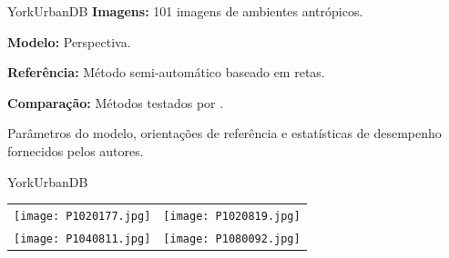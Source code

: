\begin{frame}{YorkUrbanDB}{}
  {\bf Imagens:} 101 imagens de ambientes antrópicos.

  {\bf Modelo:} Perspectiva.

  {\bf Referência:} Método semi-automático baseado em retas.

  {\bf Comparação:} Métodos testados por \cite{Denis2008}.

  Parâmetros do modelo, orientações de referência e estatísticas de
  desempenho fornecidos pelos autores.

\end{frame}

\begin{frame}{YorkUrbanDB}
\begin{center}
\begin{tabular}{cc}
  \texttt{[image: P1020177.jpg]}&
  \texttt{[image: P1020819.jpg]}\\
  \texttt{[image: P1040811.jpg]}&
  \texttt{[image: P1080092.jpg]}
\end{tabular}
\end{center}
\end{frame}


